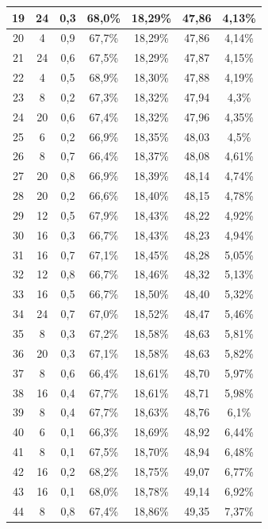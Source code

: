 \begin{longtable}{|c|c|c|c|c|c|c|}
19 & 24 & 0,3 &  68,0\% & 18,29\% & 47,86 & 4,13\% \\ \hline
20 & 4 & 0,9 &  67,7\% & 18,29\% & 47,86 & 4,14\% \\ \hline
21 & 24 & 0,6 &  67,5\% & 18,29\% & 47,87 & 4,15\% \\ \hline
22 & 4 & 0,5 &  68,9\% & 18,30\% & 47,88 & 4,19\% \\ \hline
23 & 8 & 0,2 &  67,3\% & 18,32\% & 47,94 & 4,3\% \\ \hline
24 & 20 & 0,6 &  67,4\% & 18,32\% & 47,96 & 4,35\% \\ \hline
25 & 6 & 0,2 &  66,9\% & 18,35\% & 48,03 & 4,5\% \\ \hline
26 & 8 & 0,7 &  66,4\% & 18,37\% & 48,08 & 4,61\% \\ \hline
27 & 20 & 0,8 &  66,9\% & 18,39\% & 48,14 & 4,74\% \\ \hline
28 & 20 & 0,2 &  66,6\% & 18,40\% & 48,15 & 4,78\% \\ \hline
29 & 12 & 0,5 &  67,9\% & 18,43\% & 48,22 & 4,92\% \\ \hline
30 & 16 & 0,3 &  66,7\% & 18,43\% & 48,23 & 4,94\% \\ \hline
31 & 16 & 0,7 &  67,1\% & 18,45\% & 48,28 & 5,05\% \\ \hline
32 & 12 & 0,8 &  66,7\% & 18,46\% & 48,32 & 5,13\% \\ \hline
33 & 16 & 0,5 &  66,7\% & 18,50\% & 48,40 & 5,32\% \\ \hline
34 & 24 & 0,7 &  67,0\% & 18,52\% & 48,47 & 5,46\% \\ \hline
35 & 8 & 0,3 &  67,2\% & 18,58\% & 48,63 & 5,81\% \\ \hline
36 & 20 & 0,3 &  67,1\% & 18,58\% & 48,63 & 5,82\% \\ \hline
37 & 8 & 0,6 &  66,4\% & 18,61\% & 48,70 & 5,97\% \\ \hline
38 & 16 & 0,4 &  67,7\% & 18,61\% & 48,71 & 5,98\% \\ \hline
39 & 8 & 0,4 &  67,7\% & 18,63\% & 48,76 & 6,1\% \\ \hline
40 & 6 & 0,1 &  66,3\% & 18,69\% & 48,92 & 6,44\% \\ \hline
41 & 8 & 0,1 &  67,5\% & 18,70\% & 48,94 & 6,48\% \\ \hline
42 & 16 & 0,2 &  68,2\% & 18,75\% & 49,07 & 6,77\% \\ \hline
43 & 16 & 0,1 &  68,0\% & 18,78\% & 49,14 & 6,92\% \\ \hline
44 & 8 & 0,8 &  67,4\% & 18,86\% & 49,35 & 7,37\% \\ \hline

\end{longtable}
